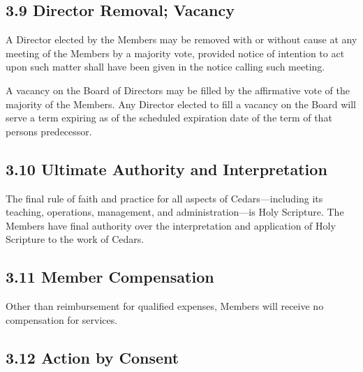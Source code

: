 \documentclass[
]{book}
\begin{document}
\subsection*{3.9 Director Removal; Vacancy}\label{director-removal-vacancy}

A Director elected by the Members may be removed with or without cause at any meeting of the Members by a majority vote, provided notice of intention to act upon such matter shall have been given in the notice calling such meeting.

A vacancy on the Board of Directors may be filled by the affirmative vote of the majority of the Members. Any Director elected to fill a vacancy on the Board will serve a term expiring as of the scheduled expiration date of the term of that person\textquotesingle s predecessor.

\subsection*{3.10 Ultimate Authority and Interpretation}\label{ultimate-authority-and-interpretation}

The final rule of faith and practice for all aspects of Cedars---including its teaching, operations, management, and administration---is Holy Scripture. The Members have final authority over the interpretation and application of Holy Scripture to the work of Cedars.

\subsection*{3.11 Member Compensation}\label{member-compensation}

Other than reimbursement for qualified expenses, Members will receive no compensation for services.

\subsection*{3.12 Action by Consent}\label{action-by-consent}
\end{document}
